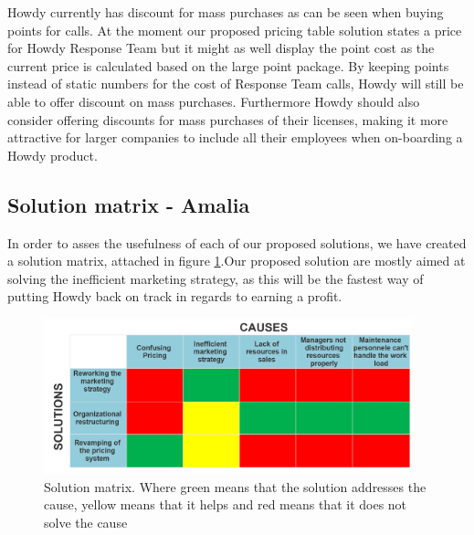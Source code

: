 \noindent Howdy currently has discount for mass purchases as can be seen when buying points for calls. At the moment our proposed pricing table solution states a price for Howdy Response Team but it might as well display the point cost as the current price is calculated based on the large point package. By keeping points instead of static numbers for the cost of Response Team calls, Howdy will still be able to offer discount on mass purchases. Furthermore Howdy should also consider offering discounts for mass purchases of their licenses, making it more attractive for larger companies to include all their employees when on-boarding a Howdy product. 

\subsection{Solution matrix - Amalia}

In order to asses the usefulness of each of our proposed solutions, we have created a solution matrix, attached in figure \ref{fig:solution}.Our proposed solution are mostly aimed at solving the inefficient marketing strategy, as this will be the fastest way of putting Howdy back on track in regards to earning a profit.

\begin{figure}[H]
\centering
\includegraphics[width=0.95\textwidth]{figures/solutionmatrix.png}
\caption{Solution matrix. Where green means that the solution addresses the cause, yellow means that it helps and red means that it does not solve the cause}
\label{fig:solution}
\end{figure}
